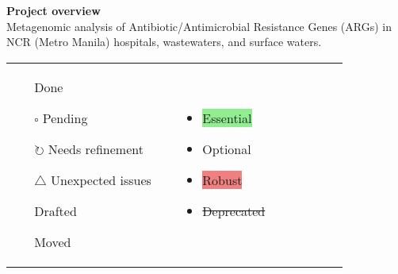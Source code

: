 \documentclass[11pt]{report}
\newcommand{\done}{\checkmark}
\newcommand{\pending}{$\square$}
\newcommand{\refine}{$\circlearrowright$}
\newcommand{\issue}{$\triangle$}
\newcommand{\draft}{\faPencil}
\newcommand{\moved}{\faArrowCircleRight}
\newcommand{\highlightessential}[1]{\colorbox{lightgreen}{#1}}
\newcommand{\highlightoptional}[1]{\colorbox{lightorange}{#1}}
\newcommand{\highlightrobust}[1]{\colorbox{lightcoral}{#1}}
\newcommand{\deprecated}[1]{\sout{#1}}
\begin{document}
	\begingroup
	\raggedright
	\colorbox{gray!15}{%
		\parbox{\dimexpr\textwidth-2\fboxsep\relax}{ %
			\vspace{0.5em} %
			\textbf{Project overview} \\
			\onehalfspacing %
			Metagenomic analysis of Antibiotic/Antimicrobial Resistance Genes (ARGs) in NCR (Metro Manila) hospitals, wastewaters, and surface waters.
			\vspace{0.5em} %
		}
	}
	\endgroup
		\begin{multicols}{2}
\begin{tcolorbox}[title=Legend]
	\begin{tabular}{p{0.45\linewidth} p{0.45\linewidth}}
		\begin{itemize}
			\item [\done] Done
			\item [\pending] Pending
			\item [\refine] Needs refinement
			\item [\issue] Unexpected issues
			\item [\draft] Drafted
			\item [\moved] Moved
		\end{itemize}
		&
		\begin{itemize}
			\item \highlightessential{Essential}
			\item \highlightoptional{Optional}
			\item \highlightrobust{Robust}
			\item \deprecated{Deprecated}
		\end{itemize}
	\end{tabular}
\end{tcolorbox}	

		
	

\end{multicols}
\end{document}
